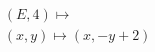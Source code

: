 \documentclass[preview]{standalone}
\begin{document}
\begin{align*}
&(E,4) \mapsto \\& (x,y) \mapsto (x, -y + 2)
\end{align*}
\end{document}
